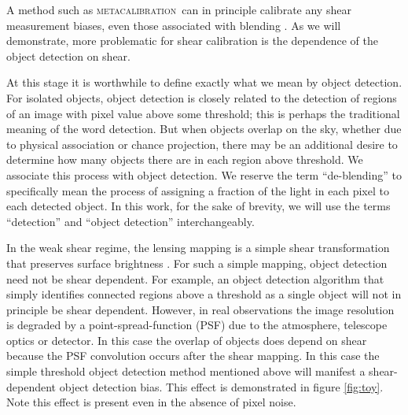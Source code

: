 \documentclass[fleqn,useAMS,usenatbib]{mnras}
\newcommand{\mcal}{\textsc{metacalibration}}
\begin{document}
A method such as \mcal\ can in principle calibrate any shear measurement
biases, even those associated with blending \citep[for discussion of blending
effects see, e.g.,][]{DawsonBlending2016}. As we will demonstrate, more
problematic for shear calibration is the dependence of the object detection on
shear.

At this stage it is worthwhile to define exactly what we mean by object
detection.  For isolated objects, object detection is closely related to the
detection of regions of an image with pixel value above some threshold; this is
perhaps the traditional meaning of the word detection. But when objects overlap
on the sky, whether due to physical association or chance projection, there may
be an additional desire to determine how many objects there are in each region
above threshold. We associate this process with object detection.  We reserve
the term ``de-blending'' to specifically mean the process of assigning a
fraction of the light in each pixel to each detected object.  In this work, for
the sake of brevity, we will use the terms ``detection'' and ``object
detection'' interchangeably.

In the weak shear regime, the lensing mapping is a simple shear transformation
that preserves surface brightness \citep{SchneiderBook92}. For such a simple
mapping, object detection need not be shear dependent. For example, an object
detection algorithm that simply identifies connected regions above a threshold
as a single object will not in principle be shear dependent. However, in real
observations the image resolution is degraded by a point-spread-function (PSF)
due to the atmosphere, telescope optics or detector. In this case the overlap
of objects does depend on shear because the PSF convolution occurs after the
shear mapping.  In this case the simple threshold object detection method
mentioned above will manifest a shear-dependent object detection bias. This
effect is demonstrated in figure \ref{fig:toy}.  Note this effect is present
even in the absence of pixel noise.
\end{document}
